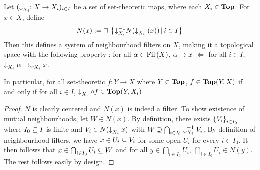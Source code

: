 \documentclass[main.tex]{subfiles}
\begin{document}
\begin{prop}
  
  Let $(\fall{}{X_i} : X \to X_i)_{i \in I}$ be a set of set-theoretic maps, 
  where each $X_i \in \TOP$.
  For $x \in X$, 
  define \[
    N(x) := \sqcap\,
    \set{{\fall{-1}{X_i}} N(\fall{}{X_i}(x)) \st i \in I}
  \]
  Then this defines a system of neighbourhood filters on $X$,
  making it a topological space with the following property : 
  for all $\al \in \fil\brkt{X}$, 
  $\al \to x$ $\iff$ 
  for all $i \in I$, $\fall{}{X_i} \al \to \fall{}{X_i} x$.

  In particular, 
  for all set-theoretic $f : Y \to X$ where $Y \in \TOP$,
  $f \in \TOP(Y,X)$ if and only if 
  for all $i \in I$, $\fall{}{X_i} \circ f \in \TOP(Y,X_i)$.
\end{prop}
\begin{proof}
% 
% 
  
  $N$ is clearly centered and $N(x)$ is indeed a filter.
  To show existence of mutual neighbourhoods, let $W \in N(x)$.
  By definition, there exists 
  $\set{V_i}_{i\in I_0}$ where $I_0 \subs I$ is finite
  and $V_i \in N(\fall{}{X_i} x)$ with 
  $W \sups \bigcap_{i \in I_0} \fall{-1}{X_i} V_i$.
  By definition of neighbourhood filters, 
  we have $x \in U_i \subs V_i$ for some open $U_i$ for every $i \in I_0$.
  It then follows that $x \in \bigcap_{i \in I_0} U_i \subs W$ and 
  for all $y \in \bigcap_{i \in I_0} U_i$, $\bigcap_{i \in I_0} U_i \in N(y)$.
  The rest follows easily by design. 
\end{proof}
\end{document}
